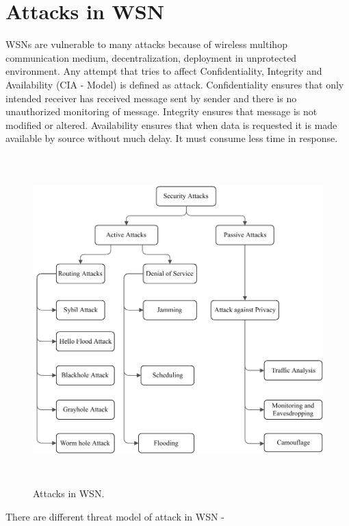 \section{Attacks in WSN} \label{S2.2}
WSNs are vulnerable to many attacks because of wireless multihop communication medium, decentralization, deployment in unprotected environment. Any attempt that tries to affect Confidentiality, Integrity and Availability (CIA - Model) is defined as attack. Confidentiality ensures that only intended receiver has received message sent by sender and there is no unauthorized monitoring of message. Integrity ensures that message is not modified or altered. Availability ensures that when data is requested it is made available by source without much delay. It must consume less time in response.
\begin{figure}[ht]
\center	
\includegraphics[width=5in, height=5in]{Figures/PDF/WSN-attacks.pdf}
\caption{Attacks in WSN.}
\label{WSN-Attacks}	
\end{figure}
\noindent
There are different threat model of attack in WSN \cite{roosta2006taxonomy}- \\
